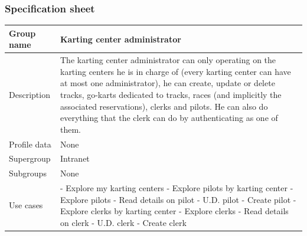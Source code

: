 \documentclass{beamer}
\begin{document}
\begin{frame}
\frametitle{Specification sheet}
\begin{table}
    \tiny
    \begin{tabular}{|p{2cm}|p{6cm}|}
    \hline
    Group name & \textbf{Karting center administrator} \\
    \hline
    Description & The karting center administrator can only operating on the karting centers he is in charge of
    (every karting center can have at most one administrator), he can create, update or delete tracks, go-karts
    dedicated to tracks, races (and implicitly the associated reservations), clerks and pilots.
    He can also do everything that the clerk can do by authenticating as one of them. \\
    \hline
    Profile data & None \\
    \hline
    Supergroup & Intranet \\
    \hline
    Subgroups & None \\
    \hline
    Use cases & 
    - Explore my karting centers \newline
    - Explore pilots by karting center \newline
    - Explore pilots \newline
    - Read details on pilot \newline
    - U.D. pilot \newline
    - Create pilot \newline
    - Explore clerks by karting center \newline
    - Explore clerks \newline
    - Read details on clerk \newline
    - U.D. clerk \newline
    - Create clerk \\
    \hline
    \end{tabular}
\end{table}
\end{frame}
\end{document}
